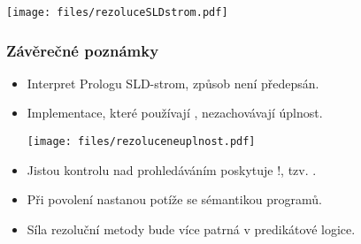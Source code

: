 \smallskip
\centerline{\texttt{[image: files/rezoluceSLDstrom.pdf]}}
\smallskip



\subsubsection*{Závěrečné poznámky}

\begin{itemize}
\item Interpret Prologu  SLD-strom, způsob není předepsán.

\item Implementace, které používají , nezachovávají úplnost.

\smallskip
\centerline{\texttt{[image: files/rezoluceneuplnost.pdf]}}
\smallskip

\item Jistou kontrolu nad prohledáváním poskytuje !, tzv. .

\item Při povolení  nastanou potíže se sémantikou programů.

\item Síla rezoluční metody bude více patrná v predikátové logice.
\end{itemize}

